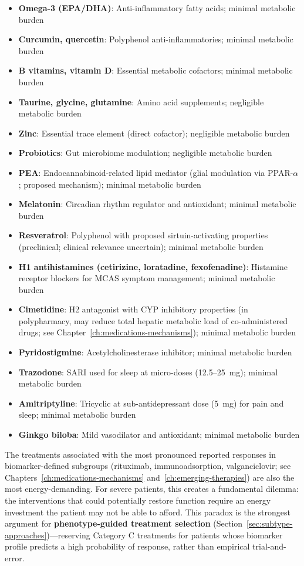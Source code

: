 \begin{itemize}
    \item \textbf{Omega-3 (EPA/DHA)}: Anti-inflammatory fatty acids; minimal metabolic burden
    \item \textbf{Curcumin, quercetin}: Polyphenol anti-inflammatories; minimal metabolic burden
    \item \textbf{B vitamins, vitamin D}: Essential metabolic cofactors; minimal metabolic burden
    \item \textbf{Taurine, glycine, glutamine}: Amino acid supplements; negligible metabolic burden
    \item \textbf{Zinc}: Essential trace element (direct cofactor); negligible metabolic burden
    \item \textbf{Probiotics}: Gut microbiome modulation; negligible metabolic burden
    \item \textbf{PEA}: Endocannabinoid-related lipid mediator (glial modulation via PPAR-$\alpha$; proposed mechanism); minimal metabolic burden
    \item \textbf{Melatonin}: Circadian rhythm regulator and antioxidant; minimal metabolic burden
    \item \textbf{Resveratrol}: Polyphenol with proposed sirtuin-activating properties (preclinical; clinical relevance uncertain); minimal metabolic burden
    \item \textbf{H1 antihistamines (cetirizine, loratadine, fexofenadine)}: Histamine receptor blockers for MCAS symptom management; minimal metabolic burden
    \item \textbf{Cimetidine}: H2 antagonist with CYP inhibitory properties (in polypharmacy, may reduce total hepatic metabolic load of co-administered drugs; see Chapter~\ref{ch:medications-mechanisms}); minimal metabolic burden
    \item \textbf{Pyridostigmine}: Acetylcholinesterase inhibitor; minimal metabolic burden
    \item \textbf{Trazodone}: SARI used for sleep at micro-doses (12.5--25~mg); minimal metabolic burden
    \item \textbf{Amitriptyline}: Tricyclic at sub-antidepressant dose (5~mg) for pain and sleep; minimal metabolic burden
    \item \textbf{Ginkgo biloba}: Mild vasodilator and antioxidant; minimal metabolic burden
\end{itemize}

\begin{warning}
The treatments associated with the most pronounced reported responses in biomarker-defined subgroups (rituximab, immunoadsorption, valganciclovir; see Chapters~\ref{ch:medications-mechanisms} and~\ref{ch:emerging-therapies}) are also the most energy-demanding. For severe patients, this creates a fundamental dilemma: the interventions that could potentially restore function require an energy investment the patient may not be able to afford. This paradox is the strongest argument for \textbf{phenotype-guided treatment selection} (Section~\ref{sec:subtype-approaches})---reserving Category C treatments for patients whose biomarker profile predicts a high probability of response, rather than empirical trial-and-error.
\end{warning}

